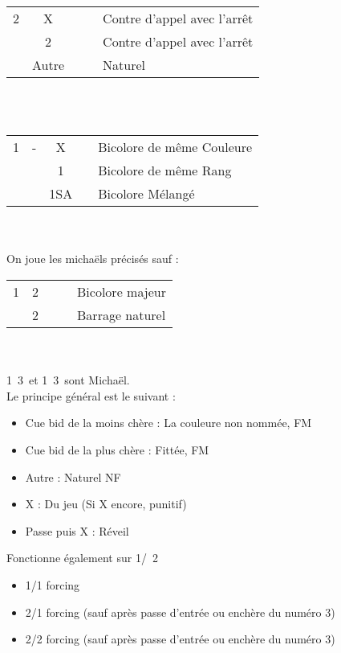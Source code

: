 \documentclass[a4paper, oneside, 11pt]{report}
\begin{document}
	\begin{tabular}{cccc|l}
	2\coeur & X &&& Contre d'appel avec l'arrêt \coeur\\
	& 2\pique &&& Contre d'appel avec l'arrêt \pique\\
	& Autre &&& Naturel\\
	\end{tabular}\\\\

	\begin{tabular}{cccc|l}
	1\trefle & -  & X && Bicolore de même Couleure\\
	&& 1\carreau && Bicolore de même Rang\\
	&& 1SA && Bicolore Mélangé\\
	\end{tabular}\\\\

	On joue les michaëls précisés sauf :\\
		
	\begin{tabular}{cccc|l}
	1\trefle & 2\trefle &&& Bicolore majeur\\
	& 2\carreau &&& Barrage naturel\\
	\end{tabular}\\\\

	1\trefle\ 3\trefle\ et 1\carreau\ 3\trefle\ sont Michaël.\\

	Le principe général est le suivant :
	\begin{itemize}
	\item Cue bid de la moins chère : La couleure non nommée, FM
	\item Cue bid de la plus chère : Fittée, FM
	\item Autre : Naturel NF\\
	\item X : Du jeu (Si X encore, punitif)
	\item Passe puis X : Réveil\\
	\end{itemize}
	Fonctionne également sur 1\trefle/\carreau\ 2\carreau

	\begin{itemize}
	\item 1/1 forcing
	\item 2/1 forcing (sauf après passe d'entrée ou enchère du numéro 3)
	\item 2/2 forcing (sauf après passe d'entrée ou enchère du numéro 3)\\
	\end{itemize}
\end{document}
